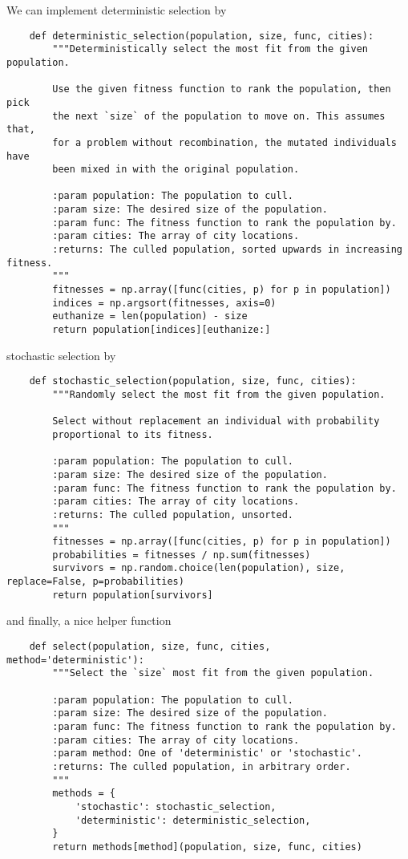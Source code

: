 \documentclass{article}
\begin{document}
We can implement deterministic selection by
\begin{verbatim}
    def deterministic_selection(population, size, func, cities):
        """Deterministically select the most fit from the given population.

        Use the given fitness function to rank the population, then pick
        the next `size` of the population to move on. This assumes that,
        for a problem without recombination, the mutated individuals have
        been mixed in with the original population.

        :param population: The population to cull.
        :param size: The desired size of the population.
        :param func: The fitness function to rank the population by.
        :param cities: The array of city locations.
        :returns: The culled population, sorted upwards in increasing fitness.
        """
        fitnesses = np.array([func(cities, p) for p in population])
        indices = np.argsort(fitnesses, axis=0)
        euthanize = len(population) - size
        return population[indices][euthanize:]
\end{verbatim}
stochastic selection by
\begin{verbatim}
    def stochastic_selection(population, size, func, cities):
        """Randomly select the most fit from the given population.

        Select without replacement an individual with probability
        proportional to its fitness.

        :param population: The population to cull.
        :param size: The desired size of the population.
        :param func: The fitness function to rank the population by.
        :param cities: The array of city locations.
        :returns: The culled population, unsorted.
        """
        fitnesses = np.array([func(cities, p) for p in population])
        probabilities = fitnesses / np.sum(fitnesses)
        survivors = np.random.choice(len(population), size, replace=False, p=probabilities)
        return population[survivors]
\end{verbatim}
and finally, a nice helper function
\begin{verbatim}
    def select(population, size, func, cities, method='deterministic'):
        """Select the `size` most fit from the given population.

        :param population: The population to cull.
        :param size: The desired size of the population.
        :param func: The fitness function to rank the population by.
        :param cities: The array of city locations.
        :param method: One of 'deterministic' or 'stochastic'.
        :returns: The culled population, in arbitrary order.
        """
        methods = {
            'stochastic': stochastic_selection,
            'deterministic': deterministic_selection,
        }
        return methods[method](population, size, func, cities)
\end{verbatim}
\end{document}
